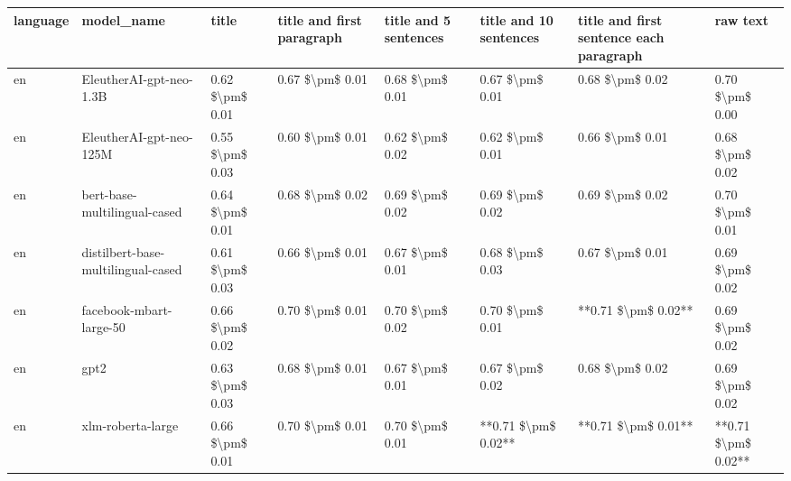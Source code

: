 \begin{tabular}{llllllll}
\toprule
language &                         model\_name &           title & title and first paragraph & title and 5 sentences & title and 10 sentences & title and first sentence each paragraph &            raw text \\
\midrule
      en &            EleutherAI-gpt-neo-1.3B & 0.62 \$\textbackslash pm\$ 0.01 &           0.67 \$\textbackslash pm\$ 0.01 &       0.68 \$\textbackslash pm\$ 0.01 &        0.67 \$\textbackslash pm\$ 0.01 &                         0.68 \$\textbackslash pm\$ 0.02 &     0.70 \$\textbackslash pm\$ 0.00 \\
      en &            EleutherAI-gpt-neo-125M & 0.55 \$\textbackslash pm\$ 0.03 &           0.60 \$\textbackslash pm\$ 0.01 &       0.62 \$\textbackslash pm\$ 0.02 &        0.62 \$\textbackslash pm\$ 0.01 &                         0.66 \$\textbackslash pm\$ 0.01 &     0.68 \$\textbackslash pm\$ 0.02 \\
      en &       bert-base-multilingual-cased & 0.64 \$\textbackslash pm\$ 0.01 &           0.68 \$\textbackslash pm\$ 0.02 &       0.69 \$\textbackslash pm\$ 0.02 &        0.69 \$\textbackslash pm\$ 0.02 &                         0.69 \$\textbackslash pm\$ 0.02 &     0.70 \$\textbackslash pm\$ 0.01 \\
      en & distilbert-base-multilingual-cased & 0.61 \$\textbackslash pm\$ 0.03 &           0.66 \$\textbackslash pm\$ 0.01 &       0.67 \$\textbackslash pm\$ 0.01 &        0.68 \$\textbackslash pm\$ 0.03 &                         0.67 \$\textbackslash pm\$ 0.01 &     0.69 \$\textbackslash pm\$ 0.02 \\
      en &            facebook-mbart-large-50 & 0.66 \$\textbackslash pm\$ 0.02 &           0.70 \$\textbackslash pm\$ 0.01 &       0.70 \$\textbackslash pm\$ 0.02 &        0.70 \$\textbackslash pm\$ 0.01 &                     **0.71 \$\textbackslash pm\$ 0.02** &     0.69 \$\textbackslash pm\$ 0.02 \\
      en &                               gpt2 & 0.63 \$\textbackslash pm\$ 0.03 &           0.68 \$\textbackslash pm\$ 0.01 &       0.67 \$\textbackslash pm\$ 0.01 &        0.67 \$\textbackslash pm\$ 0.02 &                         0.68 \$\textbackslash pm\$ 0.02 &     0.69 \$\textbackslash pm\$ 0.02 \\
      en &                  xlm-roberta-large & 0.66 \$\textbackslash pm\$ 0.01 &           0.70 \$\textbackslash pm\$ 0.01 &       0.70 \$\textbackslash pm\$ 0.01 &    **0.71 \$\textbackslash pm\$ 0.02** &                     **0.71 \$\textbackslash pm\$ 0.01** & **0.71 \$\textbackslash pm\$ 0.02** \\

\end{tabular}
